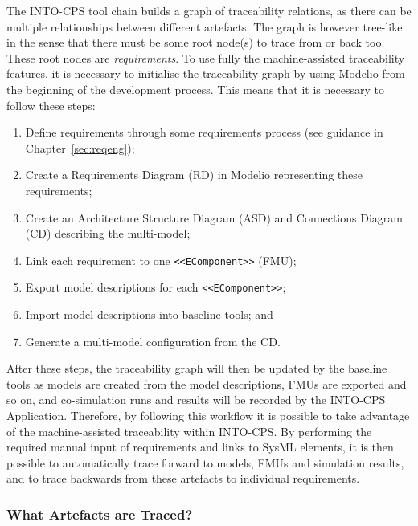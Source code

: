 The INTO-CPS tool chain builds a graph of traceability relations, as there can be multiple relationships between different artefacts. The graph is however tree-like in the sense that there must be some root node(s) to trace from or back too. These root nodes are \emph{requirements}. To use fully the machine-assisted traceability features, it is necessary to initialise the traceability graph by using Modelio from the beginning of the development process. This means that it is necessary to follow these steps:

\begin{enumerate}[noitemsep]
  \item Define requirements through some requirements process (see guidance in Chapter~\ref{sec:reqeng});
  \item Create a Requirements Diagram (RD) in Modelio representing these requirements;
  \item Create an Architecture Structure Diagram (ASD) and Connections Diagram (CD) describing the multi-model;
  \item Link each requirement to one \texttt{<<EComponent>>} (FMU);
  \item Export model descriptions for each \texttt{<<EComponent>>};
  \item Import model descriptions into baseline tools; and
  \item Generate a multi-model configuration from the CD.
\end{enumerate}

After these steps, the traceability graph will then be updated by the baseline tools as models are created from the model descriptions, FMUs are exported and so on, and co-simulation runs and results will be recorded by the INTO-CPS Application. Therefore, by following this workflow it is possible to take advantage of the machine-assisted traceability within INTO-CPS. By performing the required manual input of requirements and links to SysML elements, it is then possible to automatically trace forward to models, FMUs and simulation results, and to trace backwards from these artefacts to individual requirements.

\subsubsection{What Artefacts are Traced?}


